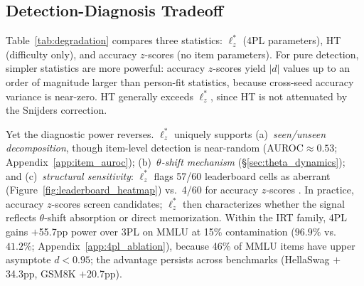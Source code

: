 \subsection{Detection-Diagnosis Tradeoff}
\label{sec:degradation}

Table~\ref{tab:degradation} compares three statistics: $\ell_z^*$ (4PL parameters), HT (difficulty only), and accuracy $z$-scores (no item parameters).
For pure detection, simpler statistics are more powerful: accuracy $z$-scores yield $|d|$ values up to an order of magnitude larger than person-fit statistics, because cross-seed accuracy variance is near-zero.
HT generally exceeds $\ell_z^*$, since HT is not attenuated by the Snijders correction.

Yet the diagnostic power reverses.
$\ell_z^*$ uniquely supports (a)~\emph{seen/unseen decomposition}, though item-level detection is near-random (AUROC${\approx}0.53$; Appendix~\ref{app:item_auroc}); (b)~\emph{$\theta$-shift mechanism} (\S\ref{sec:theta_dynamics}); and (c)~\emph{structural sensitivity}: $\ell_z^*$ flags 57/60 leaderboard cells as aberrant (Figure~\ref{fig:leaderboard_heatmap}) vs.\ 4/60 for accuracy $z$-scores \citep{stonge2011}.
In practice, accuracy $z$-scores screen candidates; $\ell_z^*$ then characterizes whether the signal reflects $\theta$-shift absorption or direct memorization.
Within the IRT family, 4PL gains $+$55.7pp power over 3PL on MMLU at 15\% contamination ($96.9\%$ vs.\ $41.2\%$; Appendix~\ref{app:4pl_ablation}), because 46\% of MMLU items have upper asymptote $d < 0.95$; the advantage persists across benchmarks (HellaSwag $+$34.3pp, GSM8K $+$20.7pp).

